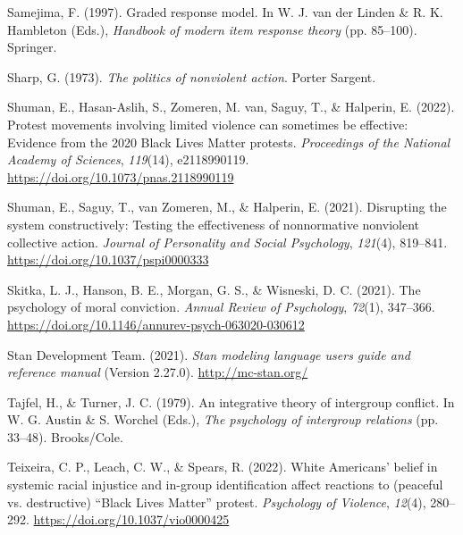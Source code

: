 \documentclass[12pt, letterpaper]{article}
\newenvironment{CSLReferences}[2]{}{}
\begin{document}
\begin{CSLReferences}{1}{0}
\leavevmode{}%
Samejima, F. (1997). Graded response model. In W. J. van der Linden \&
R. K. Hambleton (Eds.), \emph{Handbook of modern item response theory}
(pp. 85--100). Springer.

\leavevmode{}%
Sharp, G. (1973). \emph{The politics of nonviolent action}. Porter
Sargent.

\leavevmode{}%
Shuman, E., Hasan-Aslih, S., Zomeren, M. van, Saguy, T., \& Halperin, E.
(2022). Protest movements involving limited violence can sometimes be
effective: Evidence from the 2020 {Black Lives Matter} protests.
\emph{Proceedings of the National Academy of Sciences}, \emph{119}(14),
e2118990119. \url{https://doi.org/10.1073/pnas.2118990119}

\leavevmode{}%
Shuman, E., Saguy, T., van Zomeren, M., \& Halperin, E. (2021).
Disrupting the system constructively: {Testing} the effectiveness of
nonnormative nonviolent collective action. \emph{Journal of Personality
and Social Psychology}, \emph{121}(4), 819--841.
\url{https://doi.org/10.1037/pspi0000333}

\leavevmode{}%
Skitka, L. J., Hanson, B. E., Morgan, G. S., \& Wisneski, D. C. (2021).
The psychology of moral conviction. \emph{Annual Review of Psychology},
\emph{72}(1), 347--366.
\url{https://doi.org/10.1146/annurev-psych-063020-030612}

\leavevmode{}%
Stan Development Team. (2021). \emph{Stan modeling language users guide
and reference manual} (Version 2.27.0). \url{http://mc-stan.org/}

\leavevmode{}%
Tajfel, H., \& Turner, J. C. (1979). An integrative theory of intergroup
conflict. In W. G. Austin \& S. Worchel (Eds.), \emph{The psychology of
intergroup relations} (pp. 33--48). Brooks/Cole.

\leavevmode{}%
Teixeira, C. P., Leach, C. W., \& Spears, R. (2022). White {Americans}'
belief in systemic racial injustice and in-group identification affect
reactions to ({peaceful} vs. {destructive}) {``{Black Lives Matter}''}
protest. \emph{Psychology of Violence}, \emph{12}(4), 280--292.
\url{https://doi.org/10.1037/vio0000425}


\end{CSLReferences}
\end{document}

